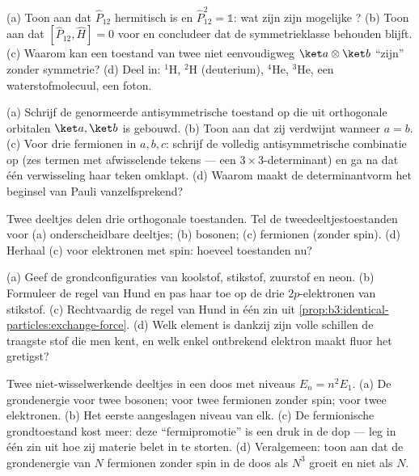 \begin{exercise}[$\star$]\label{exo:b3:identical-particles:1}
(a) Toon aan dat $\hat P_{12}$ hermitisch is en $\hat P_{12}^2 = \mathbb 1$: wat zijn zijn mogelijke ? (b) Toon aan dat $[\hat P_{12}, \hat H] =
0$ voor  en concludeer dat de symmetrieklasse
behouden blijft. (c) Waarom kan een toestand van twee 
niet eenvoudigweg $\ket a\otimes\ket b$ ``zijn'' zonder symmetrie? (d)
Deel in: $^1$H, $^2$H (deuterium), $^4$He, $^3$He, een waterstofmolecuul,
een foton.
\end{exercise}

\begin{exercise}[$\star$]\label{exo:b3:identical-particles:2}
(a) Schrijf de genormeerde antisymmetrische toestand op die uit
orthogonale orbitalen $\ket a, \ket b$ is gebouwd. (b) Toon aan dat zij
verdwijnt wanneer $a = b$. (c) Voor drie fermionen in $a, b, c$: schrijf
de volledig antisymmetrische combinatie op (zes termen met afwisselende
tekens --- een $3\times3$-determinant) en ga na dat één verwisseling haar
teken omklapt. (d) Waarom maakt de determinantvorm het beginsel van Pauli
vanzelfsprekend?
\end{exercise}

\begin{exercise}[$\star$]\label{exo:b3:identical-particles:3}
Twee deeltjes delen drie orthogonale toestanden. Tel de
tweedeeltjestoestanden voor (a) onderscheidbare deeltjes; (b) bosonen; (c)
fermionen (zonder spin). (d) Herhaal (c) voor elektronen met spin: hoeveel
toestanden nu?
\end{exercise}

\begin{exercise}[$\star$]\label{exo:b3:identical-particles:4}
(a) Geef de grondconfiguraties van koolstof, stikstof, zuurstof en neon.
(b) Formuleer de regel van Hund en pas haar toe op de drie
$2p$-elektronen van stikstof. (c) Rechtvaardig de regel van Hund in één
zin uit \cref{prop:b3:identical-particles:exchange-force}. (d) Welk
element is dankzij zijn volle schillen de traagste stof die men kent, en
welk enkel ontbrekend elektron maakt fluor het gretigst?
\end{exercise}

\begin{exercise}[$\star\star$]\label{exo:b3:identical-particles:5}
Twee niet-wisselwerkende deeltjes in een doos met niveaus $E_n = n^2E_1$.
(a) De grondenergie voor twee bosonen; voor twee fermionen zonder spin;
voor twee elektronen. (b) Het eerste aangeslagen niveau van elk. (c) De
fermionische grondtoestand kost meer: deze ``fermipromotie'' is een druk
in de dop --- leg in één zin uit hoe zij materie belet in te storten. (d)
Veralgemeen: toon aan dat de grondenergie van $N$ fermionen zonder spin in
de doos als $N^3$ groeit en niet als $N$.
\end{exercise}

